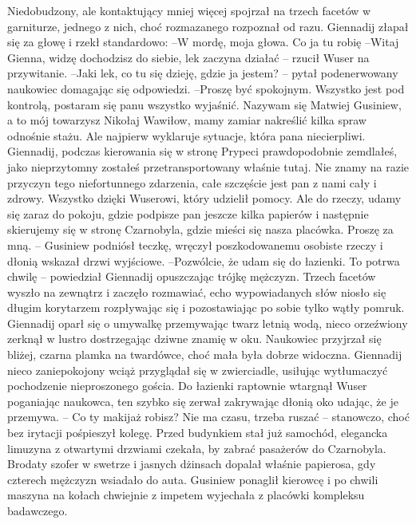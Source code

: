 \documentclass[../MAIN.tex]{subfiles}
\begin{document}
Niedobudzony, ale kontaktujący mniej więcej spojrzał na trzech facetów w garniturze, jednego z nich, choć rozmazanego rozpoznał od razu. Giennadij złapał się za głowę i rzekł standardowo: 
--W mordę, moja głowa. Co ja tu robię 
--Witaj Gienna, widzę dochodzisz do siebie, lek zaczyna działać -- rzucił Wuser na przywitanie. 
--Jaki lek, co tu się dzieję, gdzie ja jestem? -- pytał podenerwowany naukowiec domagając się odpowiedzi. 
--Proszę być spokojnym. Wszystko jest pod kontrolą, postaram się panu wszystko wyjaśnić. Nazywam się Matwiej Gusiniew, a to mój towarzysz Nikołaj Wawiłow, mamy zamiar nakreślić kilka spraw odnośnie stażu. Ale najpierw wyklaruje sytuacje, która pana niecierpliwi. Giennadij, podczas kierowania się w stronę Prypeci prawdopodobnie zemdlałeś, jako nieprzytomny zostałeś przetransportowany właśnie tutaj. Nie znamy na razie przyczyn tego niefortunnego zdarzenia, całe szczęście jest pan z nami cały i zdrowy. Wszystko dzięki Wuserowi, który udzielił pomocy. Ale do rzeczy, udamy się zaraz do pokoju, gdzie podpisze pan jeszcze kilka papierów i następnie skierujemy się w stronę Czarnobyla, gdzie mieści się nasza placówka. Proszę za mną. -- Gusiniew podniósł teczkę, wręczył poszkodowanemu osobiste rzeczy i dłonią wskazał drzwi wyjściowe. 
--Pozwólcie, że udam się do łazienki. To potrwa chwilę -- powiedział Giennadij opuszczając trójkę mężczyzn. 
Trzech facetów wyszło na zewnątrz i zaczęło rozmawiać, echo wypowiadanych słów niosło się długim korytarzem rozpływając się i pozostawiając po sobie tylko wątły pomruk. Giennadij oparł się o umywalkę przemywając twarz letnią wodą, nieco orzeźwiony zerknął w lustro dostrzegając dziwne znamię w oku. Naukowiec przyjrzał się bliżej, czarna plamka na twardówce, choć mała była dobrze widoczna. Giennadij nieco zaniepokojony wciąż przyglądał się w zwierciadle, usiłując wytłumaczyć pochodzenie nieproszonego gościa. Do łazienki raptownie wtargnął Wuser poganiając naukowca, ten szybko się zerwał zakrywając dłonią oko udając, że je przemywa. 
-- Co ty makijaż robisz? Nie ma czasu, trzeba ruszać -- stanowczo, choć bez irytacji pośpieszył kolegę. 
Przed budynkiem stał już samochód, elegancka limuzyna z otwartymi drzwiami czekała, by zabrać pasażerów do Czarnobyla. Brodaty szofer w swetrze i jasnych dżinsach dopalał właśnie papierosa, gdy czterech mężczyzn wsiadało do auta. Gusiniew ponaglił kierowcę i po chwili maszyna na kołach chwiejnie z impetem wyjechała z placówki kompleksu badawczego. 
\end{document}
